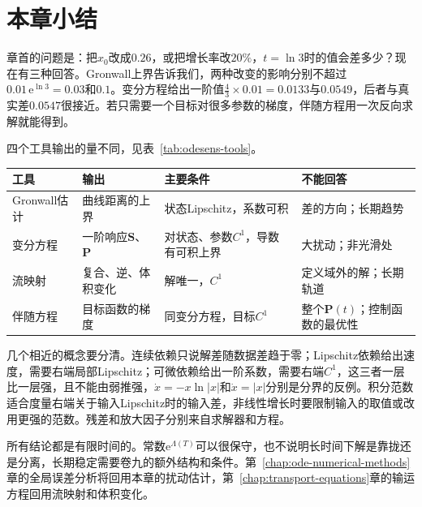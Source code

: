 \section{本章小结}
\label{sec:odesens-summary}

章首的问题是：把$x_0$改成$0.26$，或把增长率改$20\%$，$t=\ln3$时的值会差多少？现在有三种回答。Gronwall上界告诉我们，两种改变的影响分别不超过$0.01\,\mathrm{e}^{\ln3}=0.03$和$0.1$。变分方程给出一阶值$\tfrac43\times0.01=0.0133$与$0.0549$，后者与真实差$0.0547$很接近。若只需要一个目标对很多参数的梯度，伴随方程用一次反向求解就能得到。

四个工具输出的量不同，见表~\ref{tab:odesens-tools}。

\begin{BookInlineTable}
  \centering
  \caption{本章工具的对比。结论都针对给定解附近的紧时间段。}
  \label{tab:odesens-tools}
  \begin{tabular}{p{16mm}p{24mm}p{27mm}p{28mm}}
    \toprule
    工具 & 输出 & 主要条件 & 不能回答 \\
    \midrule
    Gronwall估计 & 曲线距离的上界 & 状态Lipschitz，系数可积 & 差的方向；长期趋势 \\
    变分方程 & 一阶响应$\bm{S}$、$\bm{P}$ & 对状态、参数$C^1$，导数有可积上界 & 大扰动；非光滑处 \\
    流映射 & 复合、逆、体积变化 & 解唯一，$C^1$ & 定义域外的解；长期轨道 \\
    伴随方程 & 目标函数的梯度 & 同变分方程，目标$C^1$ & 整个$\bm{P}(t)$；控制函数的最优性 \\
    \bottomrule
  \end{tabular}
\end{BookInlineTable}

几个相近的概念要分清。连续依赖只说解差随数据差趋于零；Lipschitz依赖给出速度，需要右端局部Lipschitz；可微依赖给出一阶系数，需要右端$C^1$，这三者一层比一层强，且不能由弱推强，$\dot{x}=-x\ln\lvert x\rvert$和$\dot{x}=\lvert x\rvert$分别是分界的反例。积分范数适合度量右端关于输入Lipschitz时的输入差，非线性增长时要限制输入的取值或改用更强的范数。残差和放大因子分别来自求解器和方程。

所有结论都是有限时间的。常数$\mathrm{e}^{\Lambda(T)}$可以很保守，也不说明长时间下解是靠拢还是分离，长期稳定需要卷九的额外结构和条件。第~\ref{chap:ode-numerical-methods}章的全局误差分析将回用本章的扰动估计，第~\ref{chap:transport-equations}章的输运方程回用流映射和体积变化。
